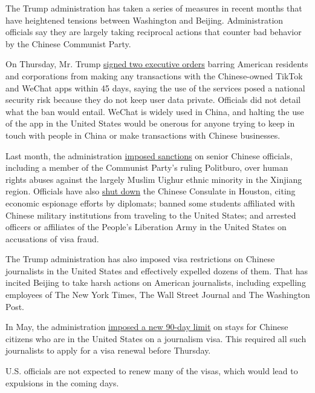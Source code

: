 The Trump administration has taken a series of measures in recent months
that have heightened tensions between Washington and Beijing.
Administration officials say they are largely taking reciprocal actions
that counter bad behavior by the Chinese Communist Party.

On Thursday, Mr. Trump
\href{https://www.nytimes3xbfgragh.onion/2020/08/06/technology/trump-wechat-tiktok-china.html}{signed
two executive orders} barring American residents and corporations from
making any transactions with the Chinese-owned TikTok and WeChat apps
within 45 days, saying the use of the services posed a national security
risk because they do not keep user data private. Officials did not
detail what the ban would entail. WeChat is widely used in China, and
halting the use of the app in the United States would be onerous for
anyone trying to keep in touch with people in China or make transactions
with Chinese businesses.

Last month, the administration
\href{https://slack-redir.net/link?url=https\%3A\%2F\%2Fwww.nytimes3xbfgragh.onion\%2F2020\%2F07\%2F09\%2Fworld\%2Fasia\%2Ftrump-china-sanctions-uighurs.html}{imposed
sanctions} on senior Chinese officials, including a member of the
Communist Party's ruling Politburo, over human rights abuses against the
largely Muslim Uighur ethnic minority in the Xinjiang region. Officials
have also
\href{https://www.nytimes3xbfgragh.onion/2020/07/22/world/asia/us-china-houston-consulate.html}{shut
down} the Chinese Consulate in Houston, citing economic espionage
efforts by diplomats; banned some students affiliated with Chinese
military institutions from traveling to the United States; and arrested
officers or affiliates of the People's Liberation Army in the United
States on accusations of visa fraud.

The Trump administration has also imposed visa restrictions on Chinese
journalists in the United States and effectively expelled dozens of
them. That has incited Beijing to take harsh actions on American
journalists, including expelling employees of The New York Times, The
Wall Street Journal and The Washington Post.

In May, the administration
\href{https://www.nytimes3xbfgragh.onion/2020/05/09/us/politics/china-journalists-us-visa-crackdown.html}{imposed
a new 90-day limit} on stays for Chinese citizens who are in the United
States on a journalism visa. This required all such journalists to apply
for a visa renewal before Thursday.

U.S. officials are not expected to renew many of the visas, which would
lead to expulsions in the coming days.

